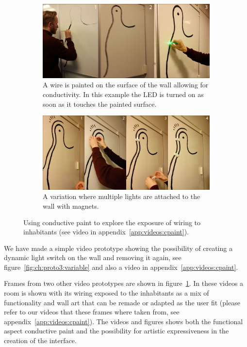 \begin{figure}[h]
  \centering
  \begin{subfigure}[t]{.9\textwidth}
    \centering
    \includegraphics[width=.9\textwidth]{figures/proto3/wallpaint-1}
    \caption{A wire is painted on the surface of the wall allowing for conductivity. In this example the LED is turned on as soon as it touches the painted surface.}
  \end{subfigure}
  \begin{subfigure}[t]{.9\textwidth}
    \vspace{0.2cm}
    \centering
    \includegraphics[width=.9\textwidth]{figures/proto3/wallpaint-2}
    \caption{A variation where multiple lights are attached to the wall with magnets.}
  \end{subfigure}
  \caption{Using conductive paint to explore the exposure of wiring to inhabitants (see video in appendix~\ref{app:videos:cpaint}).}
  \label{fig:ch:proto3:wallpaint}
\end{figure}

We have made a simple video prototype showing the possibility of creating a dynamic light switch on the wall and removing it again, see figure~\ref{fig:ch:proto3:variable} and also a video in appendix~\ref{app:videos:cpaint}.

Frames from two other video prototypes are shown in figure~\ref{fig:ch:proto3:wallpaint}.
In these videos a room is shown with its wiring exposed to the inhabitants as a mix of functionality and wall art that can be remade or adapted as the user fit (please refer to our videos that these frames where taken from, see appendix~\ref{app:videos:cpaint}).
The videos and figures shows both the functional aspect conductive paint and the possibility for artistic expressiveness in the creation of the interface.

